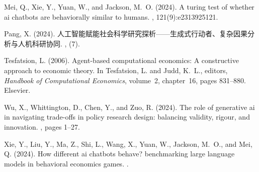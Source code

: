 \begin{thebibliography}{}
Mei, Q., Xie, Y., Yuan, W., and Jackson, M.~O. (2024).
\newblock A turing test of whether ai chatbots are behaviorally similar to humans.
, 121(9):e2313925121.

Pang, X. (2024).
\newblock 人工智能赋能社会科学研究探析——生成式行动者、复杂因果分析与人机科研协同.
, (7).

Tesfatsion, L. (2006).
\newblock Agent-based computational economics: A constructive approach to economic theory.
\newblock In Tesfatsion, L. and Judd, K.~L., editors, {\em Handbook of Computational Economics}, volume~2, chapter~16, pages 831--880. Elsevier.

Wu, X., Whittington, D., Chen, Y., and Zuo, R. (2024).
\newblock The role of generative ai in navigating trade-offs in policy research design: balancing validity, rigour, and innovation.
, pages 1--27.

Xie, Y., Liu, Y., Ma, Z., Shi, L., Wang, X., Yuan, W., Jackson, M.~O., and Mei, Q. (2024).
\newblock How different ai chatbots behave? benchmarking large language models in behavioral economics games.
.

\end{thebibliography}
